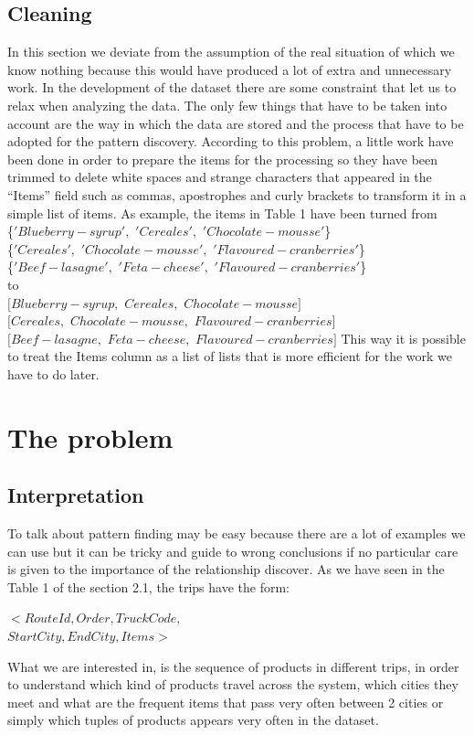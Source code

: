 \documentclass{acm_proc_article-sp-sigmod09}
\begin{document}
	\subsection{Cleaning}
	In this section we deviate from the assumption of the real situation of which we know nothing because this would have produced a lot of extra and unnecessary work. In the development of the dataset there are some constraint that let us to relax when analyzing the data. The only few things that have to be taken into account are the way in which the data are stored and the process that have to be adopted for the pattern discovery. According to this problem, a little work have been done in order to prepare the items for the processing so they have been trimmed to delete white spaces and strange characters that appeared in the ``Items'' field such as commas, apostrophes and curly brackets to transform it in a simple list of items.
	As example, the items in Table 1 have been turned from\\
	\{$'Blueberry-syrup',$ $'Cereales',$ $'Chocolate-mousse'$\}\\
	\{$'Cereales',$ $'Chocolate-mousse',$ $'Flavoured-cranberries'$\}\\
	\{$'Beef-lasagne',$ $'Feta-cheese',$ $'Flavoured-cranberries'$\}
	\\to\\
	$[Blueberry-syrup,$ $Cereales,$ $Chocolate-mousse]$\\
	$[Cereales,$ $Chocolate-mousse,$ $Flavoured-cranberries]$\\
	$[Beef-lasagne,$ $Feta-cheese,$ $Flavoured-cranberries]$
	This way it is possible to treat the Items column as a list of lists that is more efficient for the work we have to do later.
	
	\section{The problem}
	
	\subsection{Interpretation}	
	To talk about pattern finding may be easy because there are a lot of examples we can use but it can be tricky and guide to wrong conclusions if no particular care is given to the importance of the relationship discover.
	As we have seen in the Table 1 of the section 2.1, the trips have the form:
	\begin{center}
	$<RouteId,$\quad \quad$Order,$\quad \quad$TruckCode,$\\
	\qquad$StartCity,$\quad$EndCity,$\quad$Items$\quad\qquad$>$
	\end{center}
	What we are interested in, is the sequence of products in different trips, in order to understand which kind of products travel across the system, which cities they meet and what are the frequent items that pass very often between 2 cities or simply which tuples of products appears very often in the dataset.
	
\end{document}
